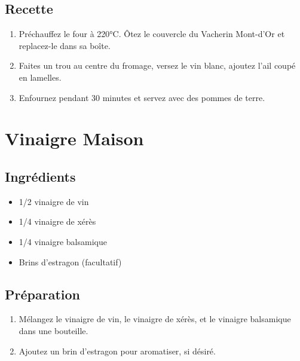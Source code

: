 \subsection{Recette}\label{recette-13}

\begin{enumerate}
\def\labelenumi{\arabic{enumi}.}

\item
  Préchauffez le four à 220°C. Ôtez le couvercle du Vacherin Mont-d'Or
  et replacez-le dans sa boîte.
\item
  Faites un trou au centre du fromage, versez le vin blanc, ajoutez
  l'ail coupé en lamelles.
\item
  Enfournez pendant 30 minutes et servez avec des pommes de terre.
\end{enumerate}

\section{Vinaigre Maison}\label{vinaigre-maison}

\subsection{Ingrédients}\label{ingruxe9dients-21}

\begin{itemize}

\item
  1/2 vinaigre de vin
\item
  1/4 vinaigre de xérès
\item
  1/4 vinaigre balsamique
\item
  Brins d'estragon (facultatif)
\end{itemize}

\subsection{Préparation}\label{pruxe9paration-6}

\begin{enumerate}
\def\labelenumi{\arabic{enumi}.}

\item
  Mélangez le vinaigre de vin, le vinaigre de xérès, et le vinaigre
  balsamique dans une bouteille.
\item
  Ajoutez un brin d'estragon pour aromatiser, si désiré.
\end{enumerate}
